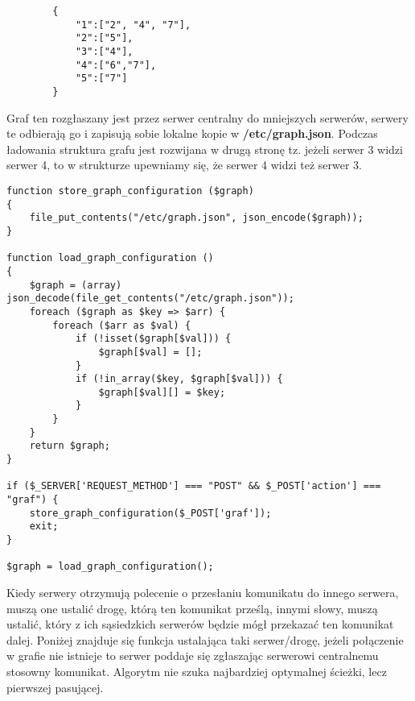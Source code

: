 \begin{empty}
	\begin{verbatim}
		{
			"1":["2", "4", "7"],
			"2":["5"],
			"3":["4"],
			"4":["6","7"],
			"5":["7"]
		}
	\end{verbatim}
	\vspace{-10pt}
\end{empty}

\vspace{10pt}
Graf ten rozgłaszany jest przez serwer centralny do mniejszych serwerów, serwery te odbierają go i zapisują sobie lokalne kopie w \textbf{/etc/graph.json}. Podczas ładowania struktura grafu jest rozwijana w drugą stronę tz. jeżeli serwer 3 widzi serwer 4, to w strukturze upewniamy się, że serwer 4 widzi też serwer 3.

\vspace{-10pt}
\begin{empty}
	\begin{verbatim}
function store_graph_configuration ($graph)
{
	file_put_contents("/etc/graph.json", json_encode($graph));
}

function load_graph_configuration ()
{
	$graph = (array) json_decode(file_get_contents("/etc/graph.json"));
	foreach ($graph as $key => $arr) {
		foreach ($arr as $val) {
			if (!isset($graph[$val])) {
				$graph[$val] = [];
			}
			if (!in_array($key, $graph[$val])) {
				$graph[$val][] = $key;
			}
		}
	}
	return $graph;
}

if ($_SERVER['REQUEST_METHOD'] === "POST" && $_POST['action'] === "graf") {
	store_graph_configuration($_POST['graf']); 
	exit;
}

$graph = load_graph_configuration();
	\end{verbatim}
	\vspace{-10pt}
\end{empty}


Kiedy serwery otrzymują polecenie o przesłaniu komunikatu do innego serwera, muszą one ustalić drogę, którą ten komunikat prześlą, innymi słowy, muszą ustalić, który z ich sąsiedzkich serwerów będzie mógł przekazać ten komunikat dalej. Poniżej znajduje się funkcja ustalająca taki serwer/drogę, jeżeli połączenie w grafie nie istnieje to serwer poddaje się zgłaszając serwerowi centralnemu stosowny komunikat. Algorytm nie szuka najbardziej optymalnej ścieżki, lecz pierwszej pasującej.

